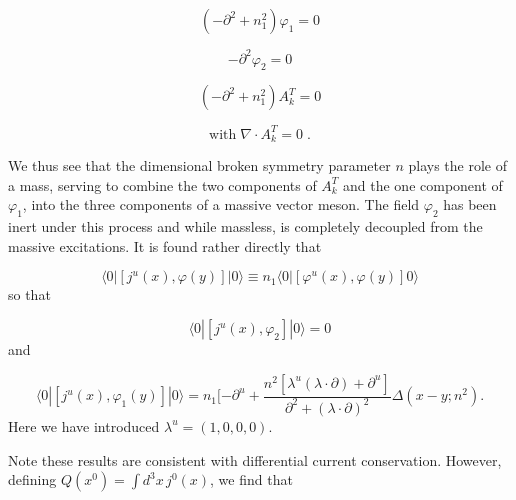 \documentclass[%
  12pt,
  paper=letter,
  abstracton,
  pagesize=auto,
  version=last,
  DIV=calc
  ]{scrartcl}
\begin{document}
\begin{equation*}
(-\partial^2+n^2_1)\varphi_1=0
\end{equation*}

\begin{equation*}
-\partial^2\varphi_2=0
\end{equation*}

\begin{equation*}
(-\partial^2+n^2_1) A^T_k=0
\end{equation*}

\begin{equation*}
\text{with}\; \nabla\cdot A^T_k=0 \; .
\end{equation*}

We thus see that the dimensional broken symmetry parameter $n$ plays
the role of a mass, serving to combine the two components of $A^T_k$
and the one component of $\varphi_1$, into the three components of a
massive vector meson.  The field $\varphi_2$ has been inert under this
process and while massless, is completely decoupled from the massive
excitations.  It is found rather directly that

\begin{equation}
\langle 0|[j^u(x), \varphi(y)]|0\rangle \equiv n_1\langle 0|[\varphi^u(x), \varphi(y)] 0\rangle
\end{equation}
so that

\begin{equation}
\langle 0|[j^u(x), \varphi_2]|0\rangle = 0
\end{equation}
and

\begin{equation}
\langle 0|[j^u(x), \varphi_1(y)]|0\rangle = n_1[-\partial^u+\frac{n^2[\lambda^u(\lambda\cdot\partial)+\partial^u]}{\partial^2+(\lambda\cdot\partial)^2}\Delta(x-y; n^2).
\end{equation}
Here we have introduced $\lambda^u=(1,0,0,0)$.

Note these results are consistent with differential current
conservation.  However, defining $Q(x^0)=\int d^3x\, j^0(x)$, we find
that
\end{document}
